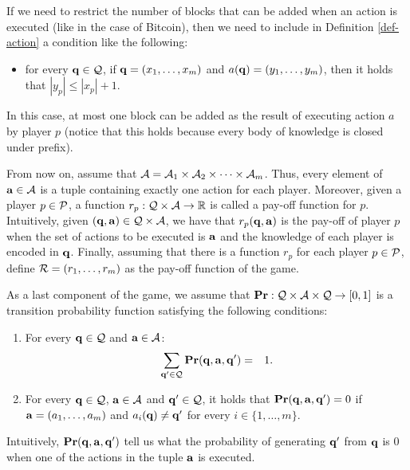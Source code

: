 If we need to restrict the number of blocks that can be added when an action is executed (like in the case of Bitcoin), then we need to include in Definition \ref{def-action} a condition like the following:
\begin{itemize}
\item for every $\mathbf{q} \in \mathcal{Q}$, if $\mathbf{q} = (x_1, \ldots, x_m)$ and $a(\mathbf{q}) = (y_1, \ldots, y_m)$, then it holds that $|y_p| \leq |x_p| + 1$.
\end{itemize}
In this case, at most one block can be added as the result of executing action $a$ by player $p$ (notice that this holds because every body of knowledge is closed under prefix).

From now on, assume that $\mathcal{A} = \mathcal{A}_{1} \times \mathcal{A}_{2} \times \cdots \times \mathcal{A}_{m}$. Thus, every element of $\mathbf{a} \in \mathcal{A}$ is a tuple containing exactly one action for each player. Moreover, given a player $p \in \mathcal{P}$, a function $r_p : \mathcal{Q} \times \mathcal{A} \to \mathbb{R}$ is called a pay-off function for $p$. Intuitively, given $(\mathbf{q}, \mathbf{a}) \in \mathcal{Q} \times \mathcal{A}$, we have that $r_p(\mathbf{q}, \mathbf{a})$ is the pay-off of player $p$ when the set of actions to be executed is $\mathbf{a}$ and the knowledge of each player is encoded in $\mathbf{q}$. Finally, assuming that there is a  function $r_p$ for each player $p \in \mathcal{P}$, define $\mathcal{R} = (r_1, \ldots, r_m)$ as the pay-off function of the game.

As a last component of the game, we assume that $\mathbf{Pr} : \mathcal{Q} \times \mathcal{A} \times \mathcal{Q} \to [0,1]$ is a transition probability function satisfying the following conditions:
\begin{enumerate}
\item For every $\mathbf{q} \in \mathcal{Q}$ and $\mathbf{a} \in \mathcal{A}$:
\begin{eqnarray*}
\sum_{\mathbf{q}' \in \mathcal{Q}} \mathbf{Pr}(\mathbf{q}, \mathbf{a}, \mathbf{q}' ) & = & 1.
\end{eqnarray*}

\item \label{c-z} For every $\mathbf{q} \in \mathcal{Q}$, $\mathbf{a} \in \mathcal{A}$ and $\mathbf{q}' \in \mathcal{Q}$, it holds that $\mathbf{Pr}(\mathbf{q}, \mathbf{a}, \mathbf{q}') = 0$ if $\mathbf{a} = (a_1, \ldots, a_m)$ and $a_i(\mathbf{q}) \neq \mathbf{q}'$ for every $i \in \{1, \ldots, m\}$.
\end{enumerate}
Intuitively, $\mathbf{Pr}(\mathbf{q}, \mathbf{a}, \mathbf{q}')$ tell us what the probability of generating $\mathbf{q}'$ from $\mathbf{q}$ is 0 when one of the actions in the tuple $\mathbf{a}$ is executed.



